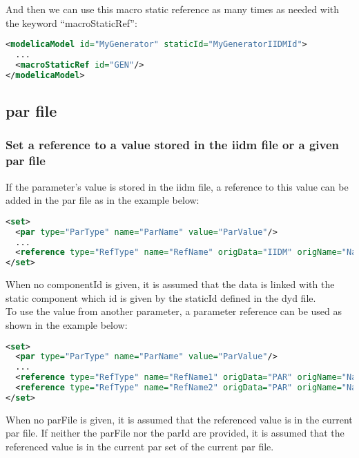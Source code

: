 \documentclass[a4paper, 12pt]{report}
\begin{document}
And then we can use this macro static reference as many times as needed with the keyword ``macroStaticRef'':
\begin{lstlisting}[language=XML, morekeywords={macroStaticRef}]
<modelicaModel id="MyGenerator" staticId="MyGeneratorIIDMId">
  ...
  <macroStaticRef id="GEN"/>
</modelicaModel>
\end{lstlisting}

\subsection{par file}

\subsubsection{Set a reference to a value stored in the iidm file or a given par file}
\label{sec:Set a reference to a value stored in the iidm file}

If the parameter's value is stored in the iidm file, a reference to this value can be added in the par file as in the example below:
\begin{lstlisting}[language=XML, morekeywords={reference}]
<set>
  <par type="ParType" name="ParName" value="ParValue"/>
  ...
  <reference type="RefType" name="RefName" origData="IIDM" origName="NameIIDM" componentId="Model_id_in_iidm_File"/>
</set>
\end{lstlisting}

When no componentId is given, it is assumed that the data is linked with the static component which id is given by the staticId defined in the dyd file.  \\

To use the value from another parameter, a parameter reference can be used as shown in the example below:

\begin{lstlisting}[language=XML, morekeywords={reference}]
<set>
  <par type="ParType" name="ParName" value="ParValue"/>
  ...
  <reference type="RefType" name="RefName1" origData="PAR" origName="NamePAR1" parId="ParID" parFile="parfile.par" />
  <reference type="RefType" name="RefName2" origData="PAR" origName="NamePAR2" parId="ParID" />
</set>
\end{lstlisting}

When no parFile is given, it is assumed that the referenced value is in the current par file. If neither the parFile nor the parId are provided, it is assumed that the referenced value is in the current par set of the current par file.
\end{document}

